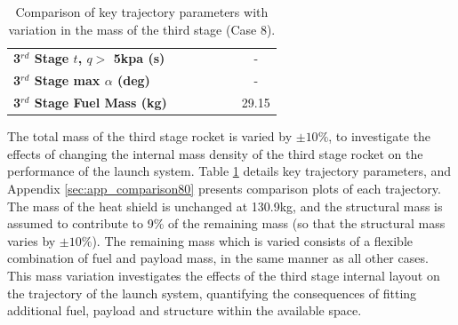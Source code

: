 \begin{table}[ht]
\begin{tabular}{l c c c c c c}
		\textbf{3$^{rd}$ Stage $t$, $q >$ 5kpa (s)}
		& \thirdqOverFivemThreeNinetyNoReturn
		& \thirdqOverFivemThreeNinetyFiveNoReturn
		& \thirdqOverFivemThreeStandardNoReturn
		& \thirdqOverFivemThreeOneHundredFiveNoReturn
		& \thirdqOverFivemThreeOneHundredTenNoReturn
		& -
		\\
		\textbf{3$^{rd}$ Stage max $\alpha$ (deg)}
		& \thirdmaxAoAmThreeNinetyNoReturn
		& \thirdmaxAoAmThreeNinetyFiveNoReturn
		& \thirdmaxAoAmThreeStandardNoReturn
		& \thirdmaxAoAmThreeOneHundredFiveNoReturn
		& \thirdmaxAoAmThreeOneHundredTenNoReturn
		& -
		\\
		\textbf{3$^{rd}$ Stage Fuel Mass (kg)}
		& \thirdmFuelmThreeNinetyNoReturn
		& \thirdmFuelmThreeNinetyFiveNoReturn
		& \thirdmFuelmThreeStandardNoReturn
		& \thirdmFuelmThreeOneHundredFiveNoReturn
		& \thirdmFuelmThreeOneHundredTenNoReturn
		&29.15
		\\
		\hline 
	\end{tabular} 
	\caption{Comparison of key trajectory parameters with variation in the mass of the third stage (Case 8).}
	\label{tab:comparison80}
\end{table}


The total mass of the third stage rocket is varied by $\pm10\%$, to investigate the effects of changing the internal mass density of the third stage rocket on the performance of the launch system. Table \ref{tab:comparison80} details key trajectory parameters, and Appendix \ref{sec:app_comparison80} presents comparison plots of each trajectory.
The mass of the heat shield is unchanged at 130.9kg, and the structural mass is assumed to contribute to 9\% of the remaining mass (so that the structural mass varies by $\pm10\%$). The remaining mass which is varied consists of a flexible combination of fuel and payload mass, in the same manner as all other cases. 
This mass variation investigates the effects of the third stage internal layout on the trajectory of the launch system, quantifying the consequences of fitting additional fuel, payload and structure within the available space.

